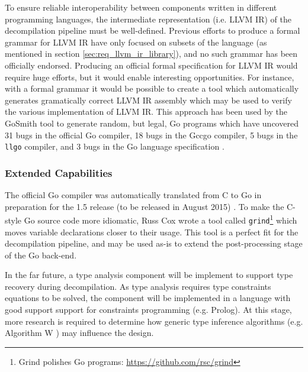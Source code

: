 To ensure reliable interoperability between components written in different programming languages, the intermediate representation (i.e. LLVM IR) of the decompilation pipeline must be well-defined. Previous efforts to produce a formal grammar for LLVM IR have only focused on subsets of the language (as mentioned in section \ref{sec:req_llvm_ir_library}), and no such grammar has been officially endorsed. Producing an official formal specification for LLVM IR would require huge efforts, but it would enable interesting opportunities. For instance, with a formal grammar it would be possible to create a tool which automatically generates gramatically correct LLVM IR assembly which may be used to verify the various implementation of LLVM IR. This approach has been used by the GoSmith tool to generate random, but legal, Go programs which have uncovered 31 bugs in the official Go compiler, 18 bugs in the Gccgo compiler, 5 bugs in the \texttt{llgo} compiler, and 3 bugs in the Go language specification \cite{gosmith}.


\subsubsection{Extended Capabilities}

The official Go compiler was automatically translated from C to Go in preparation for the 1.5 release (to be released in August 2015) \cite{go_compiler_c2go}. To make the C-style Go source code more idiomatic, Russ Cox wrote a tool called \texttt{grind}\footnote{Grind polishes Go programs: \url{https://github.com/rsc/grind}} which moves variable declarations closer to their usage. This tool is a perfect fit for the decompilation pipeline, and may be used as-is to extend the post-processing stage of the Go back-end.

In the far future, a type analysis component will be implement to support type recovery during decompilation. As type analysis requires type constraints equations to be solved, the component will be implemented in a language with good support support for constraints programming (e.g. Prolog). At this stage, more research is required to determine how generic type inference algorithms (e.g. Algorithm W \cite{algorithm_w}) may influence the design.
